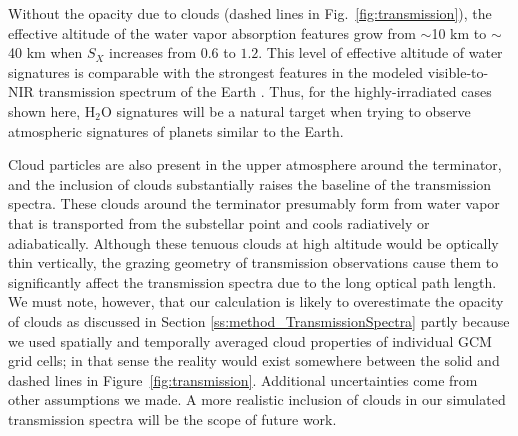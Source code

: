 \documentclass[11pt,numberedappendix,twocolappendix,]{emulateapj}
\def\water{H$_2$O }
\newcommand{\dsa}[1]{{\color{blue}#1}}
\newcommand{\yf}[1]{{\color{orange}#1}}
\begin{document}
Without the opacity due to clouds (dashed lines in Fig.~\ref{fig:transmission}), the effective altitude of the water vapor absorption features grow from $\sim $10 km to $\sim $40 km when $S_X$ increases from $0.6$ to $1.2$. 
This level of effective altitude of water signatures is comparable with the strongest features in the modeled visible-to-NIR transmission spectrum of the Earth \citep[e.g.,][]{Kaltenegger2009}.
Thus, for the highly-irradiated cases shown here, \water signatures will be a natural target when trying to observe atmospheric signatures of planets similar to the Earth. 

Cloud particles are also present in the upper atmosphere around the terminator, and the inclusion of clouds substantially raises the baseline of the transmission spectra. 
%
These clouds around the terminator presumably form from water vapor that is transported from the substellar point and cools radiatively or adiabatically. 
%
%
Although these tenuous clouds at high altitude would be optically thin \yf{vertically}, the grazing geometry of transmission observations cause them to significantly affect the transmission spectra due to the long optical path length. 
We must note, however, that our calculation is likely to overestimate the opacity of clouds as discussed in Section \ref{ss:method_TransmissionSpectra} partly because we used spatially and temporally averaged cloud properties of individual GCM grid cells; in that sense the reality would exist somewhere between the solid and dashed lines in Figure~\ref{fig:transmission}.
\yf{Additional uncertainties come from other assumptions we made. } 
A more realistic inclusion of clouds in our simulated transmission spectra will be the scope of future work. 
\end{document}
